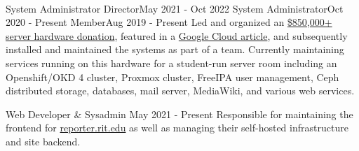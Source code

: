 \vspace{1.5pt} %


\cvtag{\LaTeX}
\medskip
\\

\vspace{6pt} %

    {System Administrator Director}{May 2021 - Oct 2022}
    {System Administrator}{Oct 2020 - Present}
    {Member}{Aug 2019 - Present}
    {Led and organized an \href{https://www.rit.edu/news/wayfair-gifts-850000-servers-rits-computer-science-house}{\$850,000+ server hardware donation}, featured in a \href{https://cloud.google.com/blog/transform/wayfair-server-donation-mass-open-cloud-rit-student-innovation-johonnot}{Google Cloud article}, and subsequently installed and maintained the systems as part of a team. Currently maintaining services running on this hardware for a student-run server room including an Openshift/OKD 4 cluster, Proxmox cluster, FreeIPA user management, Ceph distributed storage, databases, mail server, MediaWiki, and various web services.} 

    {Web Developer \& Sysadmin} {May 2021 - Present}
    {Responsible for maintaining the frontend for \href{https://reporter.rit.edu}{reporter.rit.edu} as well as managing their self-hosted infrastructure and site backend.}